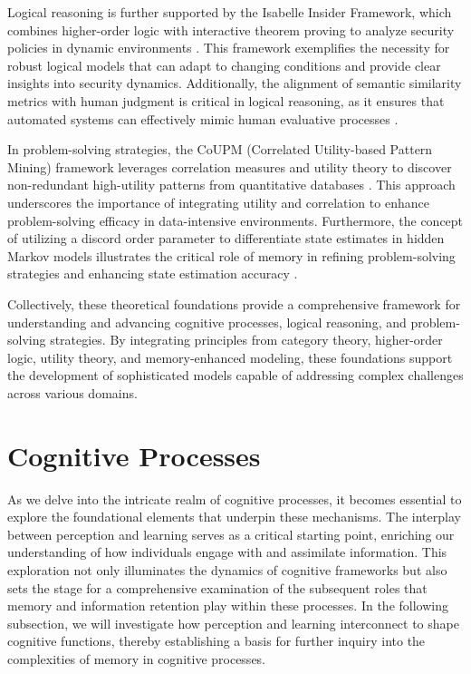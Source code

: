 Logical reasoning is further supported by the Isabelle Insider Framework, which combines higher-order logic with interactive theorem proving to analyze security policies in dynamic environments \cite{kammller2020applyingisabelleinsiderframework}. This framework exemplifies the necessity for robust logical models that can adapt to changing conditions and provide clear insights into security dynamics. Additionally, the alignment of semantic similarity metrics with human judgment is critical in logical reasoning, as it ensures that automated systems can effectively mimic human evaluative processes \cite{yamshchikov2020styletransferparaphraselookingsensible}.



In problem-solving strategies, the CoUPM (Correlated Utility-based Pattern Mining) framework leverages correlation measures and utility theory to discover non-redundant high-utility patterns from quantitative databases \cite{gan2019correlatedutilitybasedpatternmining}. This approach underscores the importance of integrating utility and correlation to enhance problem-solving efficacy in data-intensive environments. Furthermore, the concept of utilizing a discord order parameter to differentiate state estimates in hidden Markov models illustrates the critical role of memory in refining problem-solving strategies and enhancing state estimation accuracy \cite{lathouwers2017memorypaysdiscordhidden}.



Collectively, these theoretical foundations provide a comprehensive framework for understanding and advancing cognitive processes, logical reasoning, and problem-solving strategies. By integrating principles from category theory, higher-order logic, utility theory, and memory-enhanced modeling, these foundations support the development of sophisticated models capable of addressing complex challenges across various domains.












\section{Cognitive Processes} \label{sec:Cognitive Processes}

As we delve into the intricate realm of cognitive processes, it becomes essential to explore the foundational elements that underpin these mechanisms. The interplay between perception and learning serves as a critical starting point, enriching our understanding of how individuals engage with and assimilate information. This exploration not only illuminates the dynamics of cognitive frameworks but also sets the stage for a comprehensive examination of the subsequent roles that memory and information retention play within these processes. In the following subsection, we will investigate how perception and learning interconnect to shape cognitive functions, thereby establishing a basis for further inquiry into the complexities of memory in cognitive processes.






